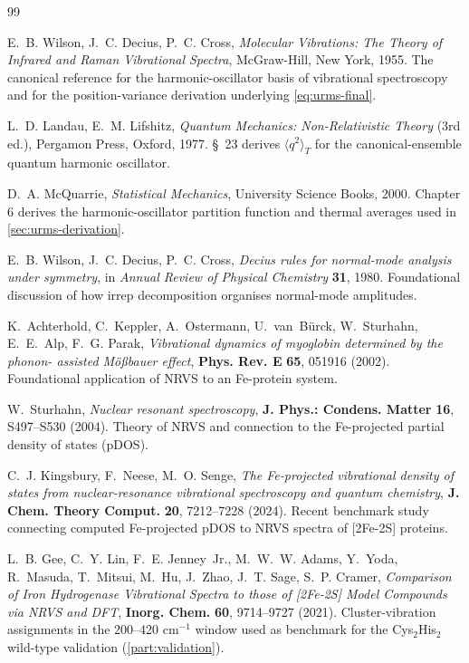\documentclass[10pt,a4paper,twoside]{article}
\begin{document}
\begin{thebibliography}{99}

E.~B. Wilson, J.~C. Decius, P.~C. Cross,
\emph{Molecular Vibrations: The Theory of Infrared and Raman
Vibrational Spectra}, McGraw-Hill, New York, 1955.
The canonical reference for the harmonic-oscillator basis of
vibrational spectroscopy and for the position-variance derivation
underlying \cref{eq:urms-final}.

L.~D. Landau, E.~M. Lifshitz,
\emph{Quantum Mechanics: Non-Relativistic Theory} (3rd ed.),
Pergamon Press, Oxford, 1977.
\S~23 derives $\langle q^2\rangle_T$ for the canonical-ensemble
quantum harmonic oscillator.

D.~A. McQuarrie,
\emph{Statistical Mechanics}, University Science Books, 2000.
Chapter 6 derives the harmonic-oscillator partition function and
thermal averages used in \cref{sec:urms-derivation}.

E.~B. Wilson, J.~C. Decius, P.~C. Cross,
\emph{Decius rules for normal-mode analysis under symmetry},
in \emph{Annual Review of Physical Chemistry} \textbf{31}, 1980.
Foundational discussion of how irrep decomposition organises
normal-mode amplitudes.

K.~Achterhold, C.~Keppler, A.~Ostermann, U.~van~B\"urck,
W.~Sturhahn, E.~E.~Alp, F.~G. Parak,
\emph{Vibrational dynamics of myoglobin determined by the phonon-
assisted M\"o\ss bauer effect},
\textbf{Phys. Rev. E} \textbf{65}, 051916 (2002).
Foundational application of NRVS to an Fe-protein system.

W.~Sturhahn,
\emph{Nuclear resonant spectroscopy},
\textbf{J. Phys.: Condens. Matter} \textbf{16}, S497--S530 (2004).
Theory of NRVS and connection to the Fe-projected partial density
of states (pDOS).

C.~J. Kingsbury, F.~Neese, M.~O. Senge,
\emph{The Fe-projected vibrational density of states from
nuclear-resonance vibrational spectroscopy and quantum chemistry},
\textbf{J. Chem. Theory Comput.} \textbf{20}, 7212--7228 (2024).
Recent benchmark study connecting computed Fe-projected pDOS to
NRVS spectra of [2Fe-2S] proteins.

L.~B. Gee, C.~Y. Lin, F.~E. Jenney~Jr., M.~W.~W. Adams, Y.~Yoda,
R.~Masuda, T.~Mitsui, M.~Hu, J.~Zhao, J.~T. Sage, S.~P. Cramer,
\emph{Comparison of Iron Hydrogenase Vibrational Spectra to those
of [2Fe-2S] Model Compounds via NRVS and DFT},
\textbf{Inorg. Chem.} \textbf{60}, 9714--9727 (2021).
Cluster-vibration assignments in the 200--420 cm$^{-1}$ window
used as benchmark for the Cys$_2$His$_2$ wild-type validation
(\cref{part:validation}).


\end{thebibliography}
\end{document}
